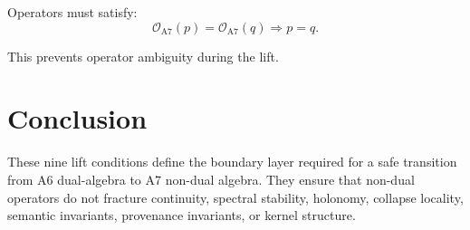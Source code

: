 \documentclass[11pt]{article}
\begin{document}
Operators must satisfy:
\[
\mathcal{O}_{\mathrm{A7}}(p)
  = \mathcal{O}_{\mathrm{A7}}(q)
  \Rightarrow p = q.
\]

This prevents operator ambiguity during the lift.

\section{Conclusion}

These nine lift conditions define the boundary layer required for a safe
transition from A6 dual-algebra to A7 non-dual algebra. They ensure that
non-dual operators do not fracture continuity, spectral stability, holonomy,
collapse locality, semantic invariants, provenance invariants, or kernel
structure.
\end{document}
